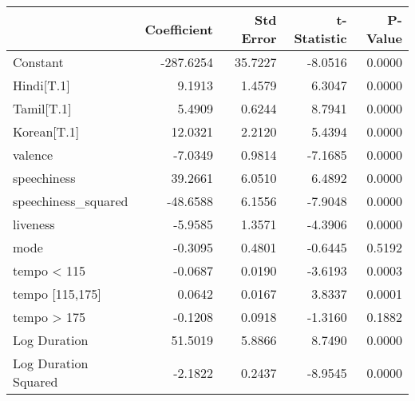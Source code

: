\begin{tabular}{lrrrr}
\toprule
 & Coefficient & Std Error & t-Statistic & P-Value \\
\midrule
Constant & -287.6254 & 35.7227 & -8.0516 & 0.0000 \\
Hindi[T.1] & 9.1913 & 1.4579 & 6.3047 & 0.0000 \\
Tamil[T.1] & 5.4909 & 0.6244 & 8.7941 & 0.0000 \\
Korean[T.1] & 12.0321 & 2.2120 & 5.4394 & 0.0000 \\
valence & -7.0349 & 0.9814 & -7.1685 & 0.0000 \\
speechiness & 39.2661 & 6.0510 & 6.4892 & 0.0000 \\
speechiness_squared & -48.6588 & 6.1556 & -7.9048 & 0.0000 \\
liveness & -5.9585 & 1.3571 & -4.3906 & 0.0000 \\
mode & -0.3095 & 0.4801 & -0.6445 & 0.5192 \\
tempo < 115 & -0.0687 & 0.0190 & -3.6193 & 0.0003 \\
tempo [115,175] & 0.0642 & 0.0167 & 3.8337 & 0.0001 \\
tempo > 175 & -0.1208 & 0.0918 & -1.3160 & 0.1882 \\
Log Duration & 51.5019 & 5.8866 & 8.7490 & 0.0000 \\
Log Duration Squared & -2.1822 & 0.2437 & -8.9545 & 0.0000 \\
\bottomrule
\end{tabular}
